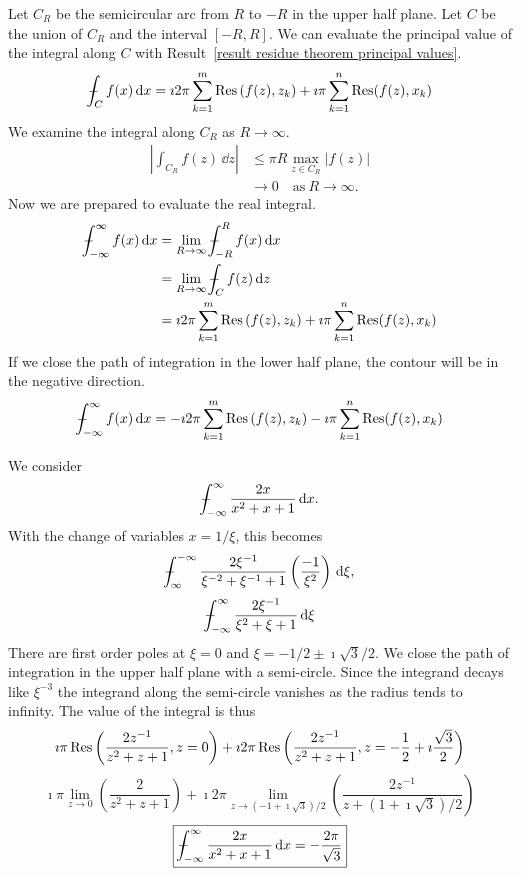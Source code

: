 {%
\begin{Solution}
  \label{solution int mii f(x)}
  Let $C_R$ be the semicircular arc from $R$ to $-R$ in the upper half plane.
  Let $C$ be the union of $C_R$ and the interval $[-R,R]$.  
  We can evaluate the principal value of the integral along $C$ with 
  Result~\ref{result residue theorem principal values}.
  \[
  - \negthickspace \negthickspace \negthickspace \negmedspace \int_C f(x) \,\mathrm{d} x = \imath 2 \pi \sum_{k=1}^m \mathop{\mathrm{Res}}\nolimits \left( f(z), z_k \right)
  + \imath \pi \sum_{k=1}^n \mathop{\mathrm{Res}}\nolimits( f(z), x_k )
  \]
  We examine the integral along $C_R$ as $R \to \infty$.
  \begin{align*}
    \left| \int_{C_R} f(z) \,\dd z \right|
    &\leq \pi R \max_{z \in C_R} \left| f(z) \right| \\
    &\to 0 \quad \mathrm{as}\ R \to \infty.
  \end{align*}
  Now we are prepared to evaluate the real integral.
  \begin{align*}
    \pv \int_{-\infty}^\infty f(x) \,\dd x
    &= \lim_{R \to \infty} \pv \int_{-R}^R f(x) \,\dd x \\
    &= \lim_{R \to \infty} \pv \int_C f(z) \,\dd z \\
    &= \imath 2 \pi \sum_{k=1}^m \Res \left( f(z), z_k \right)
    + \imath \pi \sum_{k=1}^n \Res( f(z), x_k )
  \end{align*}
  If we close the path of integration in the lower half plane, the contour 
  will be in the negative direction.
  \[
  - \negthickspace \negthickspace \negthickspace \negmedspace \int_{-\infty}^\infty f(x) \,\mathrm{d} x = - \imath 2 \pi \sum_{k=1}^m \mathop{\mathrm{Res}}\nolimits \left( f(z), z_k \right)
  - \imath \pi \sum_{k=1}^n \mathop{\mathrm{Res}}\nolimits( f(z), x_k )
  \]
\end{Solution}





\begin{Solution}
  \label{solution 2x/(x^2+x+1)}
  We consider
  \[
  - \negthickspace \negthickspace \negthickspace \negmedspace \int_{-\infty}^\infty \frac{2 x}{x^2 + x + 1} \,\mathrm{d} x.
  \]
  With the change of variables $x = 1/\xi$, this becomes
  \[
  - \negthickspace \negthickspace \negthickspace \negmedspace \int_\infty^{-\infty} \frac{2 \xi^{-1}}{ \xi^{-2} + \xi^{-1} + 1 }
  \left( \frac{-1}{\xi^2} \right) \,\mathrm{d} \xi,
  \]
  \[
  - \negthickspace \negthickspace \negthickspace \negmedspace \int_{-\infty}^\infty \frac{2 \xi^{-1}}{ \xi^2 + \xi + 1 }\,\mathrm{d} \xi
  \]
  There are first order poles at $\xi = 0$ and $\xi = -1/2 \pm \imath \sqrt{3}/2$.
  We close the path of integration in the upper half plane with a semi-circle.
  Since the integrand decays like $\xi^{-3}$ the integrand along the 
  semi-circle vanishes as the radius tends to infinity.  The value 
  of the integral is thus
  \[
  \imath \pi \mathop{\mathrm{Res}}\nolimits \left( \frac{2 z^{-1}}{z^2 + z + 1}, z = 0 \right)
  + \imath 2 \pi \mathop{\mathrm{Res}}\nolimits \left( \frac{2 z^{-1}}{z^2 + z + 1}, 
    z = - \frac{1}{2} + \imath \frac{ \sqrt{3} }{2} \right)
  \]
  \[
  \imath \pi \lim_{z \to 0} \left( \frac{ 2 }{ z^2 + z + 1 } \right)
  + \imath 2 \pi \lim_{z \to (-1+\imath \sqrt{3})/2} 
  \left( \frac{ 2 z^{-1} }{ z + (1 + \imath \sqrt{3} )/2 } \right)
  \]
  \[
  \boxed{
    - \negthickspace \negthickspace \negthickspace \negmedspace \int_{-\infty}^\infty \frac{2 x}{x^2 + x + 1} \,\mathrm{d} x = 
    - \frac{ 2 \pi }{ \sqrt{3} }
    }
  \]
\end{Solution}



}
